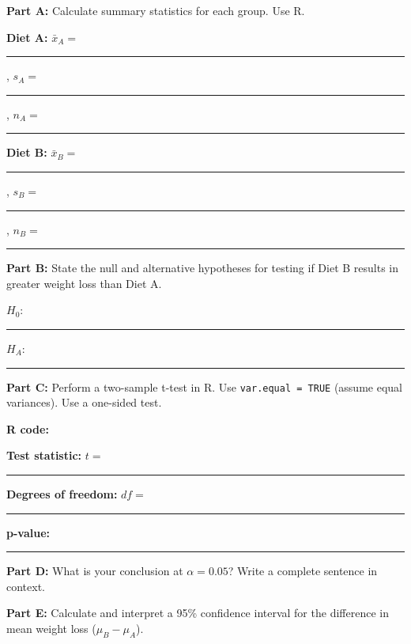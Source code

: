 \documentclass[11pt]{article}
\begin{document}
\vspace{6pt}

\textbf{Part A:} Calculate summary statistics for each group. Use R.

\vspace{0.3cm}

\textbf{Diet A:} $\bar{x}_A = $ \rule{2cm}{0.4pt}, $s_A = $ \rule{2cm}{0.4pt}, $n_A = $ \rule{1.5cm}{0.4pt}

\vspace{0.3cm}

\textbf{Diet B:} $\bar{x}_B = $ \rule{2cm}{0.4pt}, $s_B = $ \rule{2cm}{0.4pt}, $n_B = $ \rule{1.5cm}{0.4pt}

\vspace{0.3cm}

\textbf{Part B:} State the null and alternative hypotheses for testing if Diet B results in greater weight loss than Diet A.

\vspace{0.3cm}

$H_0$: \rule{8cm}{0.4pt}

\vspace{0.5cm}

$H_A$: \rule{8cm}{0.4pt}

\vspace{0.5cm}

\textbf{Part C:} Perform a two-sample t-test in R. Use \texttt{var.equal = TRUE} (assume equal variances). Use a one-sided test.

\vspace{0.3cm}

\textbf{R code:}

\vspace{3cm}

\textbf{Test statistic:} $t = $ \rule{2cm}{0.4pt}

\vspace{0.3cm}

\textbf{Degrees of freedom:} $df = $ \rule{2cm}{0.4pt}

\vspace{0.3cm}

\textbf{p-value:} \rule{2cm}{0.4pt}

\vspace{0.3cm}

\textbf{Part D:} What is your conclusion at $\alpha = 0.05$? Write a complete sentence in context.

\vspace{3cm}

\textbf{Part E:} Calculate and interpret a 95\% confidence interval for the difference in mean weight loss ($\mu_B - \mu_A$).
\end{document}
